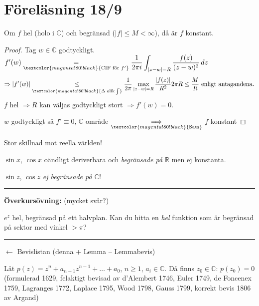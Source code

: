 \section{Föreläsning 18/9}

\begin{theorem}
Om $f$ hel (holo i $\mathbb{C}$) och begränsad ($|f| \le M < \infty$), då är $f$ konstant.
\end{theorem}
\begin{proof}
Tag $w \in \mathbb{C}$ godtyckligt. $f'(w) \underset{\textcolor{magenta!80!black}{\text{CIF för } f'}}{=} \dfrac{1}{2\pi i} \displaystyle\int_{|z - w| = R} \frac{f(z)}{(z - w)^2}\,dz$
\[ \Rightarrow |f'(w)| \underset{\textcolor{magenta!80!black}{\Delta\text{ olik} \int}}{\le} \frac{1}{2\pi} \max_{|z - w| = R} \frac{|f(z)|}{R^2} 2\pi R \le \frac{M}{R} \text{ enligt antagandena.} \]
$f$ hel $\Rightarrow R$ kan väljas godtyckligt stort $\Rightarrow f'(w) = 0$.

$w$ godtyckligt så $f' \equiv 0$, $\mathbb{C}$ område $\overset{}{\underset{\textcolor{magenta!80!black}{\text{Sats}}}{\Longrightarrow}}$ $f$ konstant
\end{proof}

\begin{note}
Stor skillnad mot reella världen!
\end{note}

\begin{example}
$\sin x$, $\cos x$ oändligt deriverbara och \emph{begränsade på $\mathbb{R}$} men ej konstanta.

$\sin z$, $\cos z$ \emph{ej begränsade på $\mathbb{C}$}!
\end{example}

\noindent\rule{\linewidth}{0.4pt}

\textbf{Överkursövning:} (mycket svår?)

$e^z$ hel, begränsad på ett halvplan. Kan du hitta en \emph{hel} funktion som är begränsad på sektor med vinkel $> \pi$?

\noindent\rule{\linewidth}{0.4pt}

\begin{theorem}
\hfill \textcolor{blue!60!black}{$\leftarrow$ Bevislistan (denna + Lemma -- Lemmabevis)}

Låt $p(z) = z^n + a_{n-1}z^{n-1} + \dots + a_0$, $n \ge 1$, $a_i \in \mathbb{C}$. Då finns $z_0 \in \mathbb{C}$: $p(z_0) = 0$ (formulerad 1629, felaktigt bevisad av d'Alembert 1746, Euler 1749, de Foncenex 1759, Lagranges 1772, Laplace 1795, Wood 1798, Gauss 1799, korrekt bevis 1806 av Argand)
\end{theorem}

